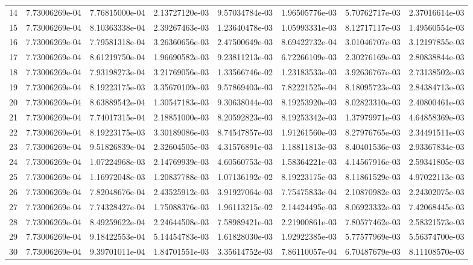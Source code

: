 \documentclass[12pt,a4paper]{article}
\begin{document}
\begin{table}[htbp]
{\begin{tabular}{cccccccc}
14 & 7.73006269e-04 & 7.76815000e-04 & 2.13727120e-03 & 9.57034784e-03 & 1.96505776e-03 & 5.70762717e-03 & 2.37016614e-03 \\
15 & 7.73006269e-04 & 8.10363338e-04 & 2.39267463e-03 & 1.23640478e-03 & 1.05993331e-03 & 8.12717117e-03 & 1.49560554e-03 \\
16 & 7.73006269e-04 & 7.79581318e-04 & 3.26360656e-03 & 2.47500649e-03 & 8.69422732e-04 & 3.01046707e-03 & 3.12197855e-03 \\
17 & 7.73006269e-04 & 8.61219750e-04 & 1.96690582e-03 & 9.23811213e-03 & 6.72266109e-03 & 2.30276169e-03 & 2.80838844e-03 \\
18 & 7.73006269e-04 & 7.93198273e-04 & 3.21769056e-03 & 1.33566746e-02 & 1.23183533e-03 & 3.92636767e-03 & 2.73138502e-03 \\
19 & 7.73006269e-04 & 8.19223175e-03 & 3.35670109e-03 & 9.57869403e-03 & 7.82221525e-04 & 8.18095723e-03 & 2.84384713e-03 \\
20 & 7.73006269e-04 & 8.63889542e-04 & 1.30547183e-03 & 9.30638044e-03 & 8.19253920e-03 & 8.02823310e-03 & 2.40800461e-03 \\
21 & 7.73006269e-04 & 7.74017315e-04 & 2.18851000e-03 & 8.20592823e-03 & 8.19253342e-03 & 1.37979971e-03 & 4.64858369e-03 \\
22 & 7.73006269e-04 & 8.19223175e-03 & 3.30189086e-03 & 8.74547857e-03 & 1.91261560e-03 & 8.27976765e-03 & 2.34491511e-03 \\
23 & 7.73006269e-04 & 9.51826839e-04 & 2.32604505e-03 & 4.31576891e-03 & 1.18811813e-03 & 8.40401536e-03 & 2.93367834e-03 \\
24 & 7.73006269e-04 & 1.07224968e-03 & 2.14769939e-03 & 4.60560753e-03 & 1.58364221e-03 & 4.14567916e-03 & 2.59341805e-03 \\
25 & 7.73006269e-04 & 1.16972048e-03 & 1.20837788e-03 & 1.07136192e-02 & 8.19223175e-03 & 8.11861529e-03 & 4.97022113e-03 \\
26 & 7.73006269e-04 & 7.82048676e-04 & 2.43525912e-03 & 3.91927064e-03 & 7.75475833e-04 & 2.10870982e-03 & 2.24302075e-03 \\
27 & 7.73006269e-04 & 7.74328427e-04 & 1.75088376e-03 & 1.96113215e-02 & 2.14424495e-03 & 8.06923332e-03 & 7.42068445e-03 \\
28 & 7.73006269e-04 & 8.49259622e-04 & 2.24644508e-03 & 7.58989421e-03 & 2.21900861e-03 & 7.80577462e-03 & 2.58321573e-03 \\
29 & 7.73006269e-04 & 9.18422553e-04 & 5.14454783e-03 & 1.61828030e-03 & 1.92922385e-03 & 5.77577969e-03 & 5.56374700e-03 \\
30 & 7.73006269e-04 & 9.39701011e-04 & 1.84701551e-03 & 3.35614752e-03 & 7.86110057e-04 & 6.70487679e-03 & 8.11108570e-03 \\
\bottomrule\end{tabular}}
\end{table}
\clearpage
\end{document}

